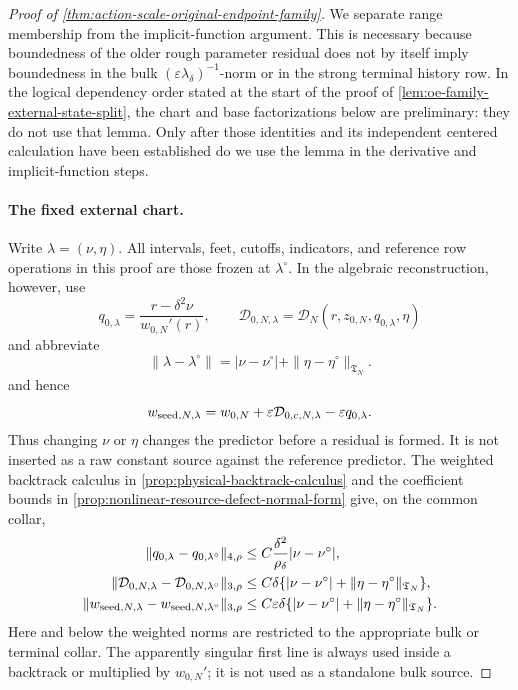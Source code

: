 \begin{proof}[Proof of
\cref{thm:action-scale-original-endpoint-family}]
We separate range membership from the implicit-function argument.  This is
necessary because boundedness of the older rough parameter residual does
not by itself imply boundedness in the bulk
\((\varepsilon\lambda_\delta)^{-1}\)-norm or in the strong terminal
history row.  In the logical dependency order stated at the start of the
proof of \cref{lem:oe-family-external-state-split}, the chart and base
factorizations below are preliminary: they do not use that lemma.  Only
after those identities and its independent centered calculation have been
established do we use the lemma in the derivative and
implicit-function steps.

\paragraph{The fixed external chart.}
Write \(\lambda=(\nu,\eta)\).  All intervals, feet, cutoffs, indicators,
and reference row operations in this proof are those frozen at
\(\lambda^\circ\).  In the algebraic reconstruction, however, use
\[
 q_{0,\lambda}
 =\frac{r-\delta^2\nu}{w_{0,N}'(r)},\qquad
 \mathcal D_{0,N,\lambda}
 =\mathcal D_N(r,z_{0,N},q_{0,\lambda},\eta)
\]
and abbreviate
\[
 \|\lambda-\lambda^\circ\|
 =|\nu-\nu^\circ|
   +\|\eta-\eta^\circ\|_{\mathfrak T_N}.
\]
and hence
\begin{equation}
 w_{{\rm seed},N,\lambda}
 =w_{0,N}
   +\varepsilon\mathcal D_{0,c,N,\lambda}
   -\varepsilon q_{0,\lambda}.                 \label{eq:proof-oe-family-actual-predictor}
\end{equation}
Thus changing \(\nu\) or \(\eta\) changes the predictor before a residual is
formed.  It is not inserted as a raw constant source against the reference
predictor.  The weighted backtrack calculus in
\cref{prop:physical-backtrack-calculus} and the coefficient bounds in
\cref{prop:nonlinear-resource-defect-normal-form} give, on the common
collar,
\begin{align}
 \|q_{0,\lambda}-q_{0,\lambda^\circ}\|_{4,\rho}
 &\le C\frac{\delta^2}{\rho_\delta}
       |\nu-\nu^\circ|,\notag\\
 \|\mathcal D_{0,N,\lambda}
       -\mathcal D_{0,N,\lambda^\circ}\|_{3,\rho}
 &\le C\delta\{
       |\nu-\nu^\circ|
       +\|\eta-\eta^\circ\|_{\mathfrak T_N}\},\notag\\
 \|w_{{\rm seed},N,\lambda}
       -w_{{\rm seed},N,\lambda^\circ}\|_{3,\rho}
 &\le C\varepsilon\delta\{
       |\nu-\nu^\circ|
       +\|\eta-\eta^\circ\|_{\mathfrak T_N}\}.   \label{eq:proof-oe-family-predictor-difference}
\end{align}
Here and below the weighted norms are restricted to the appropriate bulk
or terminal collar.  The apparently singular first line is always used
inside a backtrack or multiplied by \(w_{0,N}'\); it is not used as a
standalone bulk source.


\end{proof}
